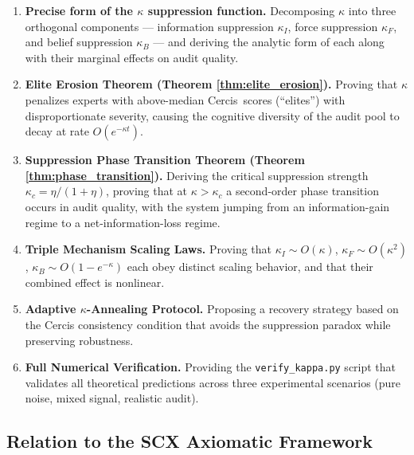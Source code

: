 \documentclass[12pt,a4paper]{article}
\theoremstyle{definition}
\newcommand{\Cercis}{\textsf{Cercis}}
\begin{document}
\begin{enumerate}[label=\textbf{C\arabic*}, leftmargin=*]
    \item \textbf{Precise form of the $\kappa$ suppression function.} Decomposing $\kappa$ into three orthogonal components --- information suppression $\kappa_I$, force suppression $\kappa_F$, and belief suppression $\kappa_B$ --- and deriving the analytic form of each along with their marginal effects on audit quality.
    \item \textbf{Elite Erosion Theorem (Theorem \ref{thm:elite_erosion}).} Proving that $\kappa$ penalizes experts with above-median \Cercis~scores (``elites'') with disproportionate severity, causing the cognitive diversity of the audit pool to decay at rate $O(e^{-\kappa t})$.
    \item \textbf{Suppression Phase Transition Theorem (Theorem \ref{thm:phase_transition}).} Deriving the critical suppression strength $\kappa_c = \eta/(1+\eta)$, proving that at $\kappa > \kappa_c$ a second-order phase transition occurs in audit quality, with the system jumping from an information-gain regime to a net-information-loss regime.
    \item \textbf{Triple Mechanism Scaling Laws.} Proving that $\kappa_I \sim O(\kappa)$, $\kappa_F \sim O(\kappa^2)$, $\kappa_B \sim O(1-e^{-\kappa})$ each obey distinct scaling behavior, and that their combined effect is nonlinear.
    \item \textbf{Adaptive $\kappa$-Annealing Protocol.} Proposing a recovery strategy based on the Cercis consistency condition that avoids the suppression paradox while preserving robustness.
    \item \textbf{Full Numerical Verification.} Providing the \texttt{verify\_kappa.py} script that validates all theoretical predictions across three experimental scenarios (pure noise, mixed signal, realistic audit).
\end{enumerate}

\subsection{Relation to the SCX Axiomatic Framework}
\label{sec:scx_relation}
\end{document}
